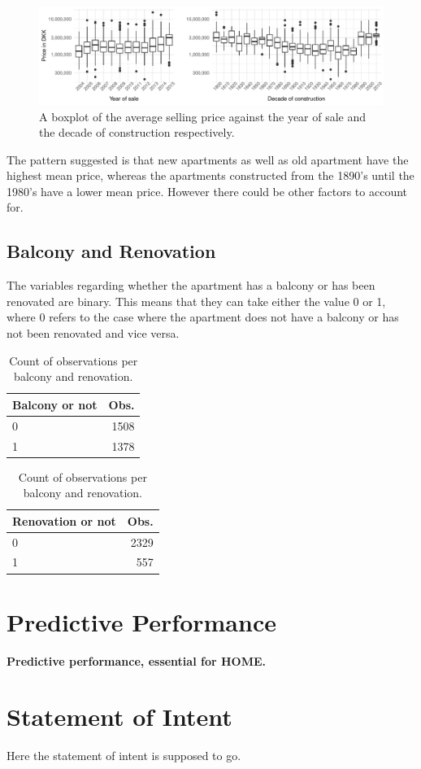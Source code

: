 \begin{figure}[H]
    \centering
    \includegraphics[width = \textwidth]{figures/Data_introduction/house_price_year.pdf}
    \caption{A boxplot of the average selling price against the year of sale and the decade of construction respectively.}
    \label{fig:house_price_year}
\end{figure}
The pattern suggested is that new apartments as well as old apartment have the highest mean price, whereas the apartments constructed from the 1890's until the 1980's have a lower mean price.
However there could be other factors to account for.

\subsection*{Balcony and Renovation}
The variables regarding whether the apartment has a balcony or has been renovated are binary.
This means that they can take either the value 0 or 1, where 0 refers to the case where the apartment does not have a balcony or has not been renovated and vice versa.
\begin{table}[H]
    \centering
    \begin{tabular}{lr}
        \toprule
        \textbf{Balcony or not} & \textbf{Obs.}\\
        \midrule
        0 & 1508\\
        1 & 1378\\
        \bottomrule
    \end{tabular}
    \hspace{20pt}
    \begin{tabular}{lr}
        \toprule
        \textbf{Renovation or not} & \textbf{Obs.}\\
        \midrule
        0 & 2329\\
        1 & 557\\
        \bottomrule
    \end{tabular}
    \caption{Count of observations per balcony and renovation.}
\end{table}

\section{Predictive Performance}
\textbf{Predictive performance, essential for HOME.}

\section{Statement of Intent}
Here the statement of intent is supposed to go.